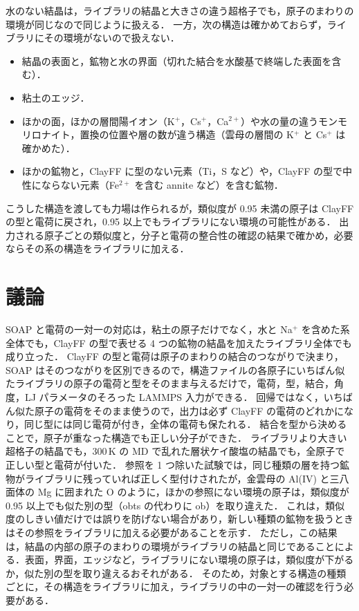 \documentclass[a4paper,11pt]{article}
\begin{document}
水のない結晶は，ライブラリの結晶と大きさの違う超格子でも，原子のまわりの環境が同じなので同じように扱える．
一方，次の構造は確かめておらず，ライブラリにその環境がないので扱えない．
\begin{itemize}
\item 結晶の表面と，鉱物と水の界面（切れた結合を水酸基で終端した表面を含む）．
\item 粘土のエッジ．
\item ほかの面，ほかの層間陽イオン（K$^+$，Cs$^+$，Ca$^{2+}$）や水の量の違うモンモリロナイト，置換の位置や層の数が違う構造（雲母の層間の K$^+$ と Cs$^+$ は確かめた）．
\item ほかの鉱物と，ClayFF に型のない元素（Ti，S など）や，ClayFF の型で中性にならない元素（Fe$^{2+}$ を含む annite など）を含む鉱物．
\end{itemize}
こうした構造を渡しても力場は作られるが，類似度が 0.95 未満の原子は ClayFF の型と電荷に戻され，0.95 以上でもライブラリにない環境の可能性がある．
出力される原子ごとの類似度と，分子と電荷の整合性の確認の結果で確かめ，必要ならその系の構造をライブラリに加える．

\section{議論}
SOAP と電荷の一対一の対応は，粘土の原子だけでなく，水と Na$^+$ を含めた系全体でも，ClayFF の型で表せる 4 つの鉱物の結晶を加えたライブラリ全体でも成り立った．
ClayFF の型と電荷は原子のまわりの結合のつながりで決まり，SOAP はそのつながりを区別できるので，構造ファイルの各原子にいちばん似たライブラリの原子の電荷と型をそのまま与えるだけで，電荷，型，結合，角度，LJ パラメータのそろった LAMMPS 入力ができる．
回帰ではなく，いちばん似た原子の電荷をそのまま使うので，出力は必ず ClayFF の電荷のどれかになり，同じ型には同じ電荷が付き，全体の電荷も保たれる．
結合を型から決めることで，原子が重なった構造でも正しい分子ができた．
ライブラリより大きい超格子の結晶でも，300\,K の MD で乱れた層状ケイ酸塩の結晶でも，全原子で正しい型と電荷が付いた．
参照を 1 つ除いた試験では，同じ種類の層を持つ鉱物がライブラリに残っていれば正しく型付けされたが，金雲母の Al(IV) と三八面体の Mg に囲まれた O のように，ほかの参照にない環境の原子は，類似度が 0.95 以上でも似た別の型（obts の代わりに ob）を取り違えた．
これは，類似度のしきい値だけでは誤りを防げない場合があり，新しい種類の鉱物を扱うときはその参照をライブラリに加える必要があることを示す．
ただし，この結果は，結晶の内部の原子のまわりの環境がライブラリの結晶と同じであることによる．表面，界面，エッジなど，ライブラリにない環境の原子は，類似度が下がるか，似た別の型を取り違えるおそれがある．
そのため，対象とする構造の種類ごとに，その構造をライブラリに加え，ライブラリの中の一対一の確認を行う必要がある．
\end{document}
